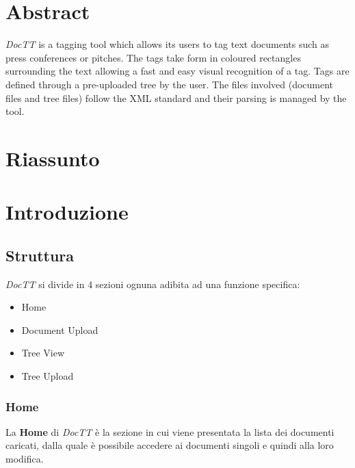 \documentclass[twoside]{supsistudent}
\begin{document}
\maketitle
\onehalfspacing
\frontmatter


\tableofcontents
\listoffigures					%
\listoftables					%

\newpage
\mainmatter
{}
\setcounter{page}{1}

\chapter*{Abstract}
\textit{DocTT} is a tagging tool which allows its users to tag text documents such as
press conferences or pitches. The tags take form in coloured rectangles
surrounding the text allowing a fast and easy visual recognition of a tag.
Tags are defined through a pre-uploaded tree by the user. The files involved
(document files and tree files) follow the XML standard and their parsing is 
managed by the tool.

\chapter*{Riassunto}
\lipsum[10]

\chapter{Introduzione}

\section{Struttura}

\textit{DocTT} si divide in 4 sezioni ognuna adibita ad una funzione specifica:
\begin{itemize}
  \item Home
  \item Document Upload
  \item Tree View
  \item Tree Upload
\end{itemize}

\subsection{Home}
La \textbf{Home} di \textit{DocTT} è la sezione in cui viene presentata la 
lista dei documenti caricati, dalla quale è possibile accedere ai documenti 
singoli e quindi alla loro modifica.
\end{document}
